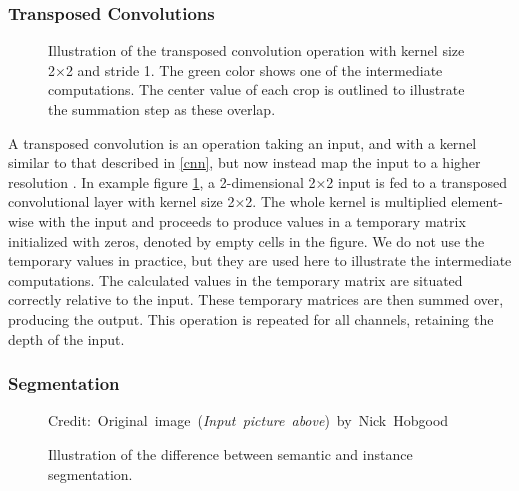     \clearpage
    
    

\subsubsection{Transposed Convolutions}
    \begin{figure}[H]
        \centering
        
        
        
        \caption[Transposed convolution]{Illustration of the transposed convolution operation with kernel size 2×2 and stride 1. The green color shows one of the intermediate computations. The center value of each crop is outlined to illustrate the summation step as these overlap.}
      	\medskip 
        \label{transposed_conv_fig}
    \end{figure}
    A transposed convolution is an operation taking an input, and with a kernel similar to that described in \ref{cnn}, but now instead map the input to a higher resolution \cite{dumoulin2016guide_transposed_convolution}. In example figure \ref{transposed_conv_fig}, a 2-dimensional 2×2 input is fed to a transposed convolutional layer with kernel size 2×2. The whole kernel is multiplied element-wise with the input and proceeds to produce values in a temporary matrix initialized with zeros, denoted by empty cells in the figure. We do not use the temporary values in practice, but they are used here to illustrate the intermediate computations. The calculated values in the temporary matrix are situated correctly relative to the input. These temporary matrices are then summed over, producing the output. This operation is repeated for all channels, retaining the depth of the input. 
            


\subsubsection{Segmentation}
    \begin{figure}[H]
        \centering
        
        \caption[Difference between semantic and instance segmentation]{Illustration of the difference between semantic and instance segmentation.}
      	\medskip 
        \hspace*{15pt}\hbox{\scriptsize Credit: Original image (\textit{Input picture above}) by Nick Hobgood\cite{clownfish_image}}
        \label{segmentation_fig}
    \end{figure}

